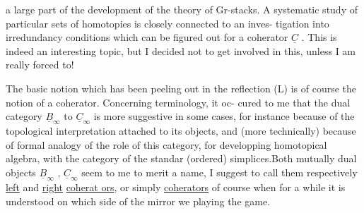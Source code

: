 a large part of the development of the theory of Gr-stacks.  A systematic
study of particular sets of homotopies is closely connected  to an inves-%
\hand{(}tigation into irredundancy conditions which can be figured out for a
 coherator $\underline{C}$ .  This is indeed an interesting topic,  but I decided not
to get involved in this,  unless I am really forced to!

The basic notion which has been peeling out in the reflection (L)
is of course the notion of a coherator.  Concerning terminology,  it oc-%
cured to me that the dual category $\underline{B}_\infty$ to $\underline{C}_\infty$ is more suggestive in some
cases,  for instance because of the topological interpretation attached
to its objects,  and (more technically)  because of formal analogy of
the role of this category,  for developping homotopical algebra,  with
 the category of the standar (ordered) simplices.Both mutually dual
objects $\underline{B}_\infty$ , $\underline{C}_\infty$ seem to me to merit a name,  I suggest to call them
respectively \uline{left} and \uline{right} \uline{coherat ors},  or simply \uline{coherators} of course
when for a while it is understood on which side of the mirror we 
playing the game.

